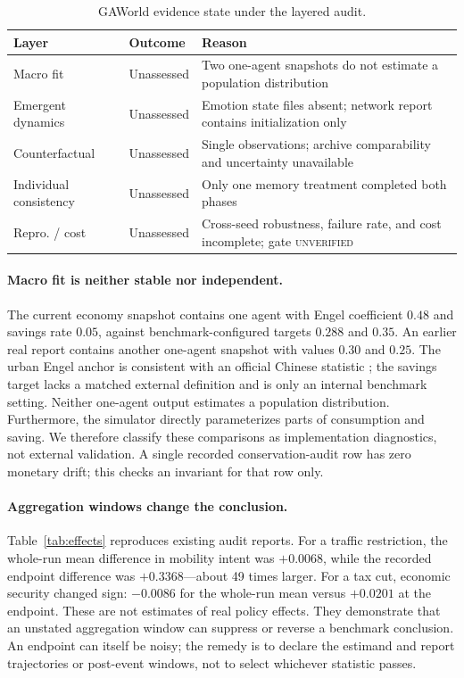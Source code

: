 \documentclass[letterpaper]{article}
\begin{document}
\begin{table}[t]
\centering
\caption{GAWorld evidence state under the layered audit.}
\label{tab:audit}
\footnotesize
\setlength{\tabcolsep}{3pt}
\begin{tabular}{>{\raggedright\arraybackslash}p{}
>{\raggedright\arraybackslash}p{}
>{\raggedright\arraybackslash}p{}}
\toprule
Layer & Outcome & Reason \\
\midrule
Macro fit & Unassessed & Two one-agent snapshots do not estimate a population distribution \\
Emergent dynamics & Unassessed & Emotion state files absent; network report contains initialization only \\
Counterfactual & Unassessed & Single observations; archive comparability and uncertainty unavailable \\
Individual consistency & Unassessed & Only one memory treatment completed both phases \\
Repro. / cost & Unassessed & Cross-seed robustness, failure rate, and cost incomplete; gate \textsc{unverified} \\
\bottomrule
\end{tabular}
\end{table}

\paragraph{Macro fit is neither stable nor independent.}
The current economy snapshot contains one agent with Engel coefficient $0.48$ and savings rate $0.05$,
against benchmark-configured targets $0.288$ and $0.35$. An earlier real report contains another
one-agent snapshot with values $0.30$ and $0.25$. The urban Engel anchor is consistent with an official
Chinese statistic \cite{nbsc2025communique}; the savings target lacks a matched external definition and
is only an internal benchmark setting. Neither one-agent output estimates a population distribution.
Furthermore, the simulator directly parameterizes parts of consumption and saving. We therefore
classify these comparisons as implementation diagnostics, not external validation. A single
recorded conservation-audit row has zero monetary drift; this checks an invariant for that row only.

\paragraph{Aggregation windows change the conclusion.}
Table~\ref{tab:effects} reproduces existing audit reports. For a traffic restriction, the whole-run mean
difference in mobility intent was $+0.0068$, while the recorded endpoint difference was $+0.3368$---about
49 times larger. For a tax cut, economic security changed sign: $-0.0086$ for the whole-run mean versus
$+0.0201$ at the endpoint. These are not estimates of real policy effects. They demonstrate that an
unstated aggregation window can suppress or reverse a benchmark conclusion. An endpoint can itself be
noisy; the remedy is to declare the estimand and report trajectories or post-event windows, not to select
whichever statistic passes.
\end{document}
